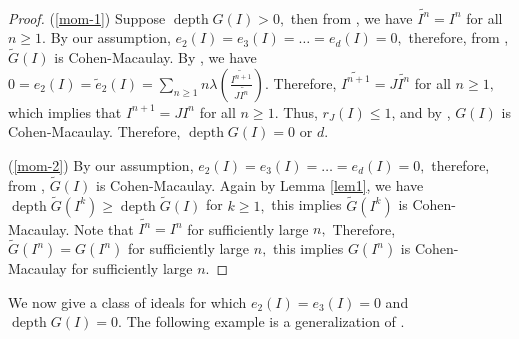 \documentclass[reqno,a4paper,dvipsnames]{amsart}
\newcommand{\depth}{\operatorname{depth}}
\theoremstyle{definition}
\begin{document}
\begin{proof} 
(\ref{mom-1}) Suppose  $\depth G(I)>0,$ then from \cite[Remark 1.6]{rs}, we have   
$\widetilde{I^{n}}=I^{n}$ for all $n \geq 1.$ By our assumption,  $e_{2}(I)=e_{3}(I)=\ldots=e_{d}(I)=0,$ therefore, 
from \cite[Theorem 6.2]{tjp2}, $\widetilde{G}(I)$ is Cohen-Macaulay. 
By \cite[Theorem 2.5(c)]{rv}, 
we have 
$
 0 =e_2(I) = \widetilde{e}_{2}(I)
=\displaystyle \sum_{n\geq1} n \lambda\left(\frac{\widetilde{I^{n+1}}}{J\widetilde{I^{n}}}\right).$ 
Therefore, $\widetilde{I^{n+1}}= J\widetilde{I^{n}}$ for all $n \geq 1,$ which implies that $I^{n+1}=JI^{n}$ for all 
$n \geq 1.$ Thus, $r_{J}(I) \leq 1$, and by \cite[Theorem 2.9(3)]{rv},   $G(I)$ is Cohen-Macaulay. Therefore,  $\depth G(I) = 0$ or $d.$

(\ref{mom-2})  By our assumption,  $e_{2}(I)=e_{3}(I)=\ldots=e_{d}(I)=0,$ therefore, 
from \cite[Theorem 6.2]{tjp2}, $\widetilde{G}(I)$ is Cohen-Macaulay. Again by Lemma \ref{lem1}, we have  $\depth \widetilde{G}(I^{k})\geq  \depth \widetilde{G}(I)$ for $k \geq 1,$ this implies $\widetilde{G}(I^{k})$ is Cohen-Macaulay. Note that $\widetilde{I^{n}}=I^{n}$ for sufficiently large $n,$ Therefore,  $\widetilde{G}(I^{n}) =G(I^{n})$ for sufficiently large $n,$ this implies $G(I^{n})$ is Cohen-Macaulay for sufficiently large $n.$
\end{proof}


We now give a class of ideals for which $e_{2}(I)=e_{3}(I)=0$ and $\depth G(I)=0.$ The following example is a generalization of \cite[Example 3.8]{rv}.
\end{document}

